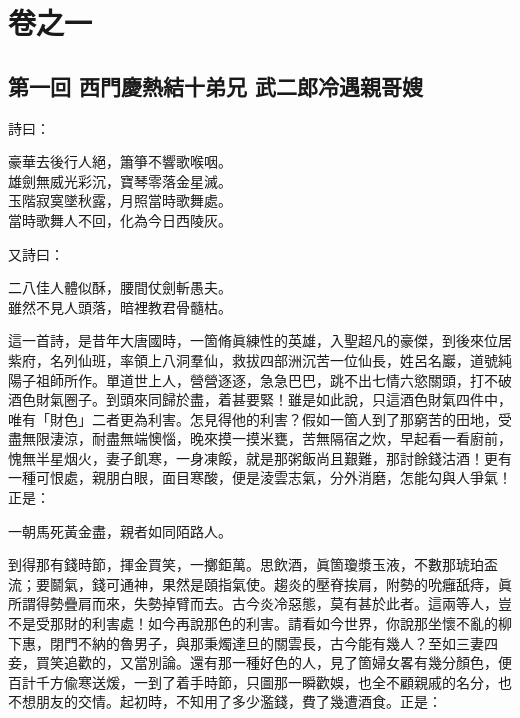 \part*{{\titlename}卷之一}



\chapter*{第一回 西門慶熱結十弟兄 武二郎冷遇親哥嫂}


詩曰：

\begin{myquote}
豪華去後行人絕，簫箏不響歌喉咽。\\
雄劍無威光彩沉，寶琴零落金星滅。\\
玉階寂寞墜秋露，月照當時歌舞處。\\
當時歌舞人不回，化為今日西陵灰。{}
\end{myquote}

又詩曰：

\begin{myquote}
二八佳人體似酥，腰間仗劍斬愚夫。{}\\
雖然不見人頭落，暗裡教君骨髓枯。
\end{myquote}

這一首詩，是昔年大唐國時，一箇脩眞練性的英雄，入聖超凡的豪傑，到後來位居紫府，名列仙班，率領上八洞羣仙，救拔四部洲沉苦一位仙長，姓呂名巖，道號純陽子祖師所作。單道世上人，營營逐逐，急急巴巴，跳不出七情六慾關頭，打不破酒色財氣圈子。到頭來同歸於盡，着甚要緊！雖是如此說，只這酒色財氣四件中，唯有「財色」二者更為利害。怎見得他的利害？假如一箇人到了那窮苦的田地，受盡無限淒涼，耐盡無端懊惱，晚來摸一摸米甕，苦無隔宿之炊，早起看一看廚前，愧無半星烟火，妻子飢寒，一身凍餒，{}就是那粥飯尚且艱難，那討餘錢沽酒！{}更有一種可恨處，親朋白眼，面目寒酸，便是淩雲志氣，分外消磨，怎能勾與人爭氣！{}正是：

\begin{myquote}
一朝馬死黃金盡，親者如同陌路人。
\end{myquote}

到得那有錢時節，揮金買笑，一擲鉅萬。思飲酒，眞箇瓊漿玉液，{}不數那琥珀盃流；要鬬氣，錢可通神，果然是頤指氣使。{}趨炎的壓脊挨肩，附勢的吮癰舐痔，眞所謂得勢疊肩而來，失勢掉臂而去。古今炎冷惡態，莫有甚於此者。這兩等人，豈不是受那財的利害處！如今再說那色的利害。{}請看如今世界，你說那坐懷不亂的柳下惠，閉門不納的魯男子，與那秉燭達旦的關雲長，古今能有幾人？至如三妻四妾，買笑追歡的，又當別論。還有那一種好色的人，見了箇婦女畧有幾分顏色，便百計千方偸寒送煖，一到了着手時節，只圖那一瞬歡娛，也全不顧親戚的名分，也不想朋友的交情。起初時，不知用了多少濫錢，費了幾遭酒食。{}正是：

